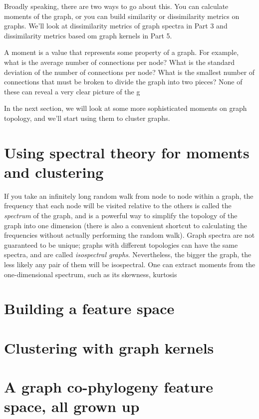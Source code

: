 \documentclass[
10pt, %
a4paper, %
oneside, %
headinclude,footinclude, %
BCOR5mm, %
]{scrartcl}
\begin{document}
Broadly speaking, there are two ways to go about this. You can calculate moments of the graph, or you can build similarity or dissimilarity metrics on graphs. We'll look at dissimilarity metrics of graph spectra in Part 3 and dissimilarity metrics based om graph kernels in Part 5. 

A moment is a value that represents some property of a graph. For example, what is the average number of connections per node? What is the standard deviation of the number of connections per node? What is the smallest number of connections that must be broken to divide the graph into two pieces? None of these can reveal a very clear picture of the g

In the next section, we will look at some more sophisticated moments on graph topology, and we'll start using them to cluster graphs.

\section{Using spectral theory for moments and clustering}

If you take an infinitely long random walk from node to node within a graph, the frequency that each node will be visited relative to the others is called the {\em spectrum} of the graph, and is a powerful way to simplify the topology of the graph into one dimension (there is also a convenient shortcut to calculating the frequencies without actually performing the random walk). Graph spectra are not guaranteed to be unique; graphs with different topologies can have the same spectra, and are called {\em isospectral graphs}. Nevertheless, the bigger the graph, the less likely any pair of them will be isospectral. One can extract moments from the one-dimensional spectrum, such as its skewness, kurtosis 

\section{Building a feature space}

\section{Clustering with graph kernels}

\section{A graph co-phylogeny feature space, all grown up}
\end{document}
